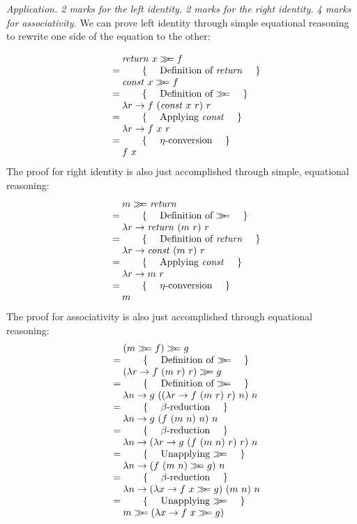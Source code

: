 \begin{parts}
    \begin{solution}
    \emph{Application. 2 marks for the left identity. 2 marks for the right identity. 4 marks for associativity.} We can prove left identity through simple equational reasoning to rewrite one side of the equation to the other:

    \begin{displaymath}
    \begin{array}{cl}
    &\quad \mathit{return}~x \gg\!\!= f\\
    &=\qquad\text{\{\quad\ Definition of $\mathit{return}$ \quad\}}\\
    &\quad \mathit{const}~x \gg\!\!= f\\
    &=\qquad\text{\{\quad\ Definition of $\gg\!\!=$ \quad\}}\\
    &\quad \lambda r \to f~(\mathit{const}~x~r)~r\\
    &=\qquad\text{\{\quad\ Applying $\mathit{const}$ \quad\}}\\
    &\quad \lambda r \to f~x~r\\
    &=\qquad\text{\{\quad\ $\eta$-conversion \quad\}}\\
    &\quad f~x
    \end{array}
    \end{displaymath}
    The proof for right identity is also just accomplished through simple, equational reasoning:
    \begin{displaymath}
    \begin{array}{cl}
    &\quad m \gg\!\!= \mathit{return}\\
    &=\qquad\text{\{\quad\ Definition of $\gg\!\!=$ \quad\}}\\
    &\quad \lambda r \to \mathit{return}~(m~r)~r\\
    &=\qquad\text{\{\quad\ Definition of $\mathit{return}$ \quad\}}\\
    &\quad \lambda r \to \mathit{const}~(m~r)~r\\
    &=\qquad\text{\{\quad\ Applying $\mathit{const}$ \quad\}}\\
    &\quad \lambda r \to m~r\\
    &=\qquad\text{\{\quad\ $\eta$-conversion \quad\}}\\
    &\quad m
    \end{array}
    \end{displaymath}
    The proof for associativity is also just accomplished through equational reasoning:
    \begin{displaymath}
    \begin{array}{cl}
    \expr{(m \bind f) \bind g}
    \hint{Definition of $\bind$}
    \expr{(\lambda r \to f~(m~r)~r) \bind g}
    \hint{Definition of $\bind$}
    \expr{\lambda n \to g~((\lambda r \to f~(m~r)~r)~n)~n}
    \hint{$\beta$-reduction}
    \expr{\lambda n \to g~(f~(m~n)~n)~n}
    \hint{$\beta$-reduction}
    \expr{\lambda n \to (\lambda r \to g~(f~(m~n)~r)~r)~n}
    \hint{Unapplying $\bind$}
    \expr{\lambda n \to (f~(m~n) \bind g)~n}
    \hint{$\beta$-reduction}
    \expr{\lambda n \to (\lambda x \to f~x \bind g)~(m~n)~n}
    \hint{Unapplying $\bind$}
    \lastexpr{m \bind (\lambda x \to f~x \bind g)}
    \end{array}
    \end{displaymath}
    \end{solution}
\end{parts}